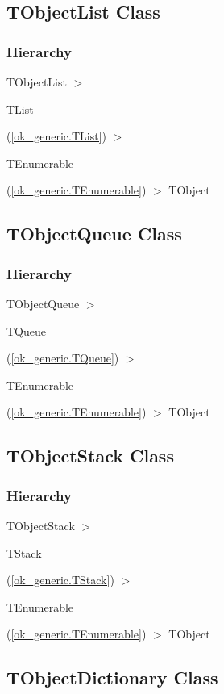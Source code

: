 \documentclass{report}
\begin{document}
\subsection*{TObjectList Class}
\subsubsection*{\large{\textbf{Hierarchy}}\normalsize\hspace{1ex}\hfill}
TObjectList {$>$} \begin{ttfamily}TList\end{ttfamily}(\ref{ok_generic.TList}) {$>$} \begin{ttfamily}TEnumerable\end{ttfamily}(\ref{ok_generic.TEnumerable}) {$>$} 
TObject
\subsection*{TObjectQueue Class}
\subsubsection*{\large{\textbf{Hierarchy}}\normalsize\hspace{1ex}\hfill}
TObjectQueue {$>$} \begin{ttfamily}TQueue\end{ttfamily}(\ref{ok_generic.TQueue}) {$>$} \begin{ttfamily}TEnumerable\end{ttfamily}(\ref{ok_generic.TEnumerable}) {$>$} 
TObject
\subsection*{TObjectStack Class}
\subsubsection*{\large{\textbf{Hierarchy}}\normalsize\hspace{1ex}\hfill}
TObjectStack {$>$} \begin{ttfamily}TStack\end{ttfamily}(\ref{ok_generic.TStack}) {$>$} \begin{ttfamily}TEnumerable\end{ttfamily}(\ref{ok_generic.TEnumerable}) {$>$} 
TObject
\subsection*{TObjectDictionary Class}
\end{document}
